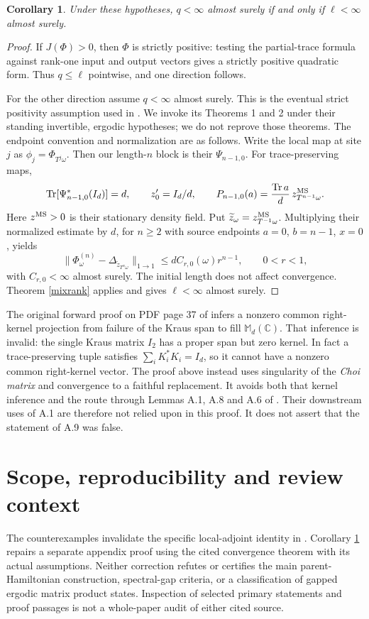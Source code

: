 \documentclass[11pt,a4paper]{article}
\newtheorem{corollary}[theorem]{Corollary}
\newcommand{\M}{\mathbb M_d(\mathbb C)}
\newcommand{\tr}{\operatorname{Tr}}
\begin{document}
\begin{corollary}\label{A9}
Under these hypotheses, $q<\infty$ almost surely if and only if $\ell<\infty$ almost surely.
\end{corollary}
\begin{proof}
If $J(\Phi)>0$, then $\Phi$ is strictly positive: testing the partial-trace formula against rank-one input and output vectors gives a strictly positive quadratic form. Thus $q\leq\ell$ pointwise, and one direction follows.

For the other direction assume $q<\infty$ almost surely. This is the eventual strict positivity assumption used in \cite{MS}. We invoke its Theorems 1 and 2 under their standing invertible, ergodic hypotheses; we do not reprove those theorems. The endpoint convention and normalization are as follows. Write the local map at site $j$ as $\phi_j=\Phi_{T^j\omega}$. Then our length-$n$ block is their $\Psi_{n-1,0}$. For trace-preserving maps,
\[
 \tr[\Psi_{n-1,0}^*(I_d)]=d,
 \qquad z'_0=I_d/d,
 \qquad P_{n-1,0}(a)=\frac{\tr a}{d}\,z^{\rm MS}_{T^{n-1}\omega}.
\]
Here $z^{\rm MS}>0$ is their stationary density field. Put
$\widetilde z_\omega=z^{\rm MS}_{T^{-1}\omega}$. Multiplying their normalized estimate by $d$, for $n\geq2$ with source endpoints $a=0$, $b=n-1$, $x=0$, yields
\begin{equation}\label{MSmatch}
 \|\Phi^{(n)}_\omega-\Delta_{\widetilde z_{T^n\omega}}\|_{1\to1}
 \leq d C_{r,0}(\omega)r^{n-1},\qquad 0<r<1,
\end{equation}
with $C_{r,0}<\infty$ almost surely. The initial length does not affect convergence. Theorem \ref{mixrank} applies and gives $\ell<\infty$ almost surely.
\end{proof}

The original forward proof on PDF page 37 of \cite{EMPS} infers a nonzero common right-kernel projection from failure of the Kraus span to fill $\M$. That inference is invalid: the single Kraus matrix $I_2$ has a proper span but zero kernel. In fact a trace-preserving tuple satisfies $\sum_iK_i^*K_i=I_d$, so it cannot have a nonzero common right-kernel vector. The proof above instead uses singularity of the \emph{Choi matrix} and convergence to a faithful replacement. It avoids both that kernel inference and the route through Lemmas A.1, A.8 and A.6 of \cite{EMPS}. Their downstream uses of A.1 are therefore not relied upon in this proof. It does not assert that the statement of A.9 was false.

\section{Scope, reproducibility and review context}
The counterexamples invalidate the specific local-adjoint identity in \cite[Lemma A.1]{EMPS}. Corollary \ref{A9} repairs a separate appendix proof using the cited convergence theorem with its actual assumptions. Neither correction refutes or certifies the main parent-Hamiltonian construction, spectral-gap criteria, or a classification of gapped ergodic matrix product states. Inspection of selected primary statements and proof passages is not a whole-paper audit of either cited source.
\end{document}
